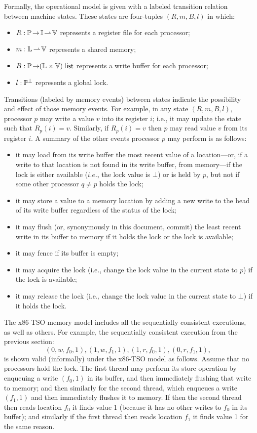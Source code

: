 \documentclass[11pt]{report}
\begin{document}
Formally, the operational model is given with a labeled transition relation between machine states. These states are four-tuples $(R,m,B,l)$ in which: \begin{itemize}
	\item $R : \mathbb{P} \operatorname{\rightarrow} \mathbb{I} \operatorname{\rightharpoonup} \mathbb{V}$ represents a register file for each processor;
	\item $m : \mathbb{L} \operatorname{\rightharpoonup} \mathbb{V}$ represents a shared memory; 
	\item $B : \mathbb{P} \operatorname{\rightarrow} (\mathbb{L} \times \mathbb{V})~\mathsf{list}$ represents a write buffer for each processor; 
	\item $l : \mathbb{P}^\bot$ represents a global lock. 
\end{itemize}

Transitions (labeled by memory events) between states indicate the possibility and effect of those memory events. For example, in any state $(R,m,B,l)$, processor $p$ may write a value $v$ into its register $i$; i.e., it may update the state such that $R_p(i) = v$. Similarly, if $R_p(i) = v$ then $p$ may read value $v$ from its register $i$. A summary of the other events processor $p$ may perform is as follows: \begin{itemize}
	\item it may load from its write buffer the most recent value of a location---or, if a write to that location is not found in its write buffer, from memory---if the lock is either available ($i.e.$, the lock value is $\bot$) or is held by $p$, but not if some other processor $q \neq p$ holds the lock;
	\item it may store a value to a memory location by adding a new write to the head of its write buffer regardless of the status of the lock; 
	\item it may flush (or, synonymously in this document, commit) the least recent write in its buffer to memory if it holds the lock or the lock is available;  
	\item it may fence if its buffer is empty;
	\item it may acquire the lock (i.e., change the lock value in the current state to $p$) if the lock is available; 
	\item it may release the lock (i.e., change the lock value in the current state to $\bot$) if it holds the lock.
\end{itemize}

The x86-TSO memory model includes all the sequentially consistent executions, as well as others. For example, the sequentially consistent execution from the previous section: \[ (0,w,f_0,1), (1,w,f_1,1), (1,r,f_0,1), (0,r,f_1,1), \] is shown valid (informally) under the x86-TSO model as follows. Assume that no processors hold the lock. The first thread may perform its store operation by enqueuing a write $(f_0,1)$ in its buffer, and then immediately flushing that write to memory; and then similarly for the second thread, which enqueues a write $(f_1,1)$ and then immediately flushes it to memory. If then the second thread then reads location $f_0$ it finds value 1 (because it has no other writes to $f_0$ in its buffer); and similarly if the first thread then reads location $f_1$ it finds value 1 for the same reason. 
\end{document}
